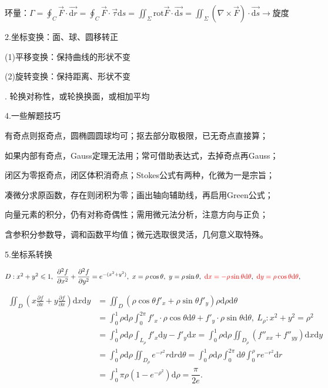 \documentclass[UTF8]{ctexart}
\newcommand\dif{\mathrm{d}}
\newcommand\no{\noindent}
\newcommand\dis{\displaystyle}
\newcommand\ls{\leqslant}
\newcommand\pfx{\dis\frac{\partial f}{\partial x}}
\newcommand\pfy{\dis\frac{\partial f}{\partial x}}
\newcommand\pfxx{\dis\frac{\partial^2 f}{\partial x^2}}
\newcommand\pfyy{\dis\frac{\partial^2 f}{\partial y^2}}
\begin{document}
\begin{spacing}{2}
\begin{enumerate}[itemindent=1.4em, label=(\arabic*)]
环量：$\dis\varGamma=
\oint_C\stackrel{\rightarrow}{F}\cdot \stackrel{\longrightarrow}{\dif r}=
\oint_C\stackrel{\rightarrow}{F}\cdot\stackrel{\rightarrow}{\tau}\dif s=
\iint_\Sigma\text{rot}\stackrel{\rightarrow}{F}\cdot\stackrel{\longrightarrow}{\dif s}
=\iint_\Sigma\left(\nabla\times\stackrel{\rightarrow}{F}\right)\cdot
\stackrel{\longrightarrow}{\dif s}
\longrightarrow$旋度

\end{enumerate}

\no2.坐标变换：面、球、圆移转正

(1)平移变换：保持曲线的形状不变

(2)旋转变换：保持距离、形状不变

\no3. \textcolor[rgb]{1,0,0}{轮换对称性}，或轮换换面，或相加平均

\no4.一些解题技巧

有奇点则抠奇点，圆椭圆圆球均可；抠去部分\textcolor[rgb]{1,0,0}{取极限}，已无奇点直接算；

如果内部有奇点，Gauss定理无法用；常可借助表达式，去掉奇点再Gauss；

闭区为零抠奇点，闭区体积消奇点；Stokes公式有两种，\textcolor[rgb]{1,0,0}{化微为一}是宗旨；

凑微分求原函数，存在则闭积为零；画出轴向辅助线，再启用Green公式；

向量元素的积分，仍有对称奇偶性；需用微元法分析，注意方向与正负；

含参积分参数导，调和函数平均值；微元选取很灵活，几何意义取特殊。

\no5.坐标系转换

$D:x^2+y^2\ls1,\ \pfxx+\pfyy=e^{-(x^2+y^2)},\ x=\rho\cos\theta,\ y=\rho\sin\theta,\ 
\textcolor[rgb]{1,0,0}{\dif x=-\rho\sin\theta\dif\theta},\ 
\textcolor[rgb]{1,0,0}{\dif y=\rho\cos\theta\dif\theta},$

\begin{spacing}{2.5}

$\begin{aligned}
\dis\iint_D\left(x\pfx+y\pfy\right)\dif x\dif y
&=\iint_D\left(\rho\cos\theta f'_x+\rho\sin\theta f'_y\right)\rho\dif\rho\dif\theta\\
&=\int_0^1\rho\dif\rho\int_0^{2\pi}f'_x\cdot\rho\cos\theta\dif\theta
+f'_y\cdot\rho\sin\theta\dif\theta,\ L_\rho: x^2+y^2=\rho^2\\
&=\int_0^1\rho\dif\rho\int_{L_\rho}f'_x\dif y-f'_y\dif x
=\int_0^1\rho\dif\rho\iint_{D_\rho}\left(f''_{xx}+f''_{yy}\right)\dif x\dif y\\
&=\int_0^1\rho\dif\rho\iint_{D_\rho}e^{-r^2}r\dif r\dif\theta
=\int_0^1\rho\dif\rho\int_0^{2\pi}\dif\theta\int_0^\rho re^{-r^2}\dif r\\
&=\int_0^1\pi\rho\left(1-e^{-\rho^2}\right)\dif\rho
=\dfrac{\pi}{2e}.
\end{aligned}$
\end{spacing}


\end{spacing}
\end{document}
